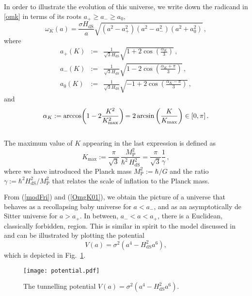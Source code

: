 \documentclass[aps,nofootinbib,prd,superscriptaddress,eqsecnum,showpacs,showkeys,preprintnumbers,altaffilletter]{revtex4}
\def\be{\begin{equation}}
\def\ee{\end{equation}}
\newcommand{\MP}{M_\mathrm{P}}
\newcommand{\beq}{\begin{eqnarray}}
\newcommand{\eeq}{\end{eqnarray}}
\newcommand{\HdS}{H_\mathrm{dS}}
\begin{document}
In order to illustrate the evolution of this universe, we write down the radicand in \eqref{omk} in terms of its roots $a_+ \geq a_- \geq a_0$,
\be\label{OmgK01}
\omega_K(a) = \frac{\sigma \HdS}{a} \sqrt{(a^2 - a_+^2)(a^2 - a_-^2)(a^2 + a_0^2)}\,,
\ee
where 
\beq 
a_+\left(K\right) &:=& \frac{1}{\sqrt{3}\HdS} \sqrt{1 + 2 \cos\!\left(\frac{\alpha_K}{3}\right)} \,, \label{root+} \\
a_-\left(K\right) &:=& \frac{1}{\sqrt{3 } \HdS} \sqrt{1 - 2 \cos\!\left(\frac{\alpha_K + \pi}{3}\right)} \,, \label{root-}\\
a_0\left(K\right) &:=& \frac{1}{\sqrt{3}\HdS} \sqrt{-1 + 2 \cos\!\left(\frac{\alpha_K - \pi}{3}\right)} \,, \label{root0}
\eeq
and
\be\label{alpha}
\alpha_K 
:= {\rm arccos}\!\left(1 - 2\frac{K^2}{K_\text{max}^2}\right) 
{= 2 \arcsin\left(\frac{ K}{K_\text{max}}\right)}
\in [0,\pi] \,.
\ee\\
The maximum value of $K$ appearing in the last expression is defined as
\be\label{kmax}
	K_\text{max} 
	:= 
     \frac{\pi}{\sqrt{3}}\,\frac{M_\text{P}^2}{\hbar^2\,\HdS^2}
	= \frac{\pi}{\sqrt{3}}\frac{1}{\gamma}
	\,,
\ee
where we have introduced the Planck mass $M_\text{P}^2 := \hbar/G$ and the ratio $\gamma:=\hbar^2\HdS^2/\MP^2$ that relates the scale of inflation to the Planck mass.

From (\ref{modFri}) and (\ref{OmgK01}), we obtain the picture of a universe that behaves as a recollapsing baby universe for $a < a_-$, and as an asymptotically de Sitter universe for $a>a_+$. In between, $a_-<a<a_+$, there is a Euclidean, classically forbidden, region. This is similar in spirit to the model discussed in \cite{mariam2002} and can be illustrated by plotting the potential
\be
V(a) =\sigma^2\left(a^4-\HdS^2a^6\right),
\ee
which is depicted in Fig.~\ref{potfig}.

\begin{figure}
  \centering
\texttt{[image: potential.pdf]}
\caption{The tunnelling potential $V(a) = \sigma^2\left(a^4-\HdS^2a^6\right)$.}
\label{potfig}
\end{figure}
\end{document}
